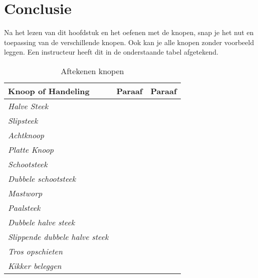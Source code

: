 \section{Conclusie}
Na het lezen van dit hoofdstuk en het oefenen met de knopen, snap je het nut en toepassing van de verschillende knopen. Ook kan je alle knopen zonder voorbeeld leggen. Een instructeur heeft dit in de onderstaande tabel afgetekend.
\vspace{2cm}
\begin{table}[H]
\centering
\caption{Aftekenen knopen}
\label{my-label}
\begin{tabular}{|l|l|l|}
\hline
\textbf{Knoop of Handeling}  & \textbf{Paraaf} & \textbf{Paraaf} \\ \hline
\textit{Halve Steek}         &                 &                 \\ \hline
\textit{Slipsteek}          &                 &                 \\ \hline
\textit{Achtknoop}           &                 &                 \\ \hline
\textit{Platte Knoop}        &                 &                 \\ \hline
\textit{Schootsteek}        &                 &                 \\ \hline
\textit{Dubbele schootsteek}        &                 &                 \\ \hline
\textit{Mastworp}            &                 &                 \\ \hline
\textit{Paalsteek}           &                 &                 \\ \hline
\textit{Dubbele halve steek} &                 &                 \\ \hline
\textit{Slippende dubbele halve steek} &                 &                 \\ \hline
\textit{Tros opschieten}     &                 &                 \\ \hline
\textit{Kikker beleggen}     &                 &                 \\ \hline
\end{tabular}
\end{table}
